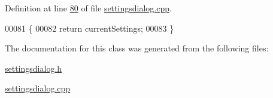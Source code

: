 Definition at line \hyperlink{a00044_source_l00080}{80} of file \hyperlink{a00044_source}{settingsdialog.\+cpp}.


\begin{DoxyCode}
00081 \{
00082     \textcolor{keywordflow}{return} currentSettings;
00083 \}
\end{DoxyCode}


The documentation for this class was generated from the following files\+:\begin{DoxyCompactItemize}
\item 
\hyperlink{a00045}{settingsdialog.\+h}\item 
\hyperlink{a00044}{settingsdialog.\+cpp}\end{DoxyCompactItemize}
